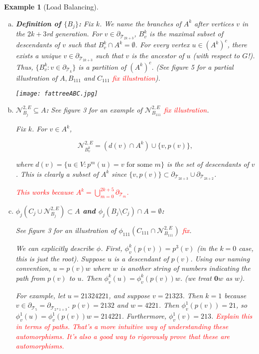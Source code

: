 \documentclass[12pt]{article}
\newcommand{\mc}{\mathcal}
\newcommand{\te}{\text}
\newcommand{\tr}{\textcolor{red}}
\newcommand{\ind}{\hspace{24pt}}
\newcommand{\bdry}[1]{\partial_{#1}}				%
\renewcommand{\root}{\mathbf{0}}					%
\newcommand{\indx}[1]{^{#1}}						%
\newcommand{\deneigh}[1]{\mc{N}^{2,E}_{#1}}			%
\newcommand{\tree}[1]{\mc{T}_{#1}}					%
\newcommand{\desc}{d}								%
\newtheorem{example}[thms]{Example}
\begin{document}
\begin{example}[Load Balancing]
\begin{description}
\begin{enumerate}[(a)]
\item {\bfseries\boldmath Definition of \(\{B_j\}\):} Fix \(k\). We name the branches of \(A\indx{k}\) after vertices \(v\) in the \(2k + 3\)rd generation. For \(v \in \bdry{\tree{2k+3}}\), \(B\indx{k}_v\) is the maximal subset of descendants of \(v\) such that \(B\indx{k}_v\cap A\indx{k} = \emptyset\). For every vertex \(u \in (A\indx{k})^c\), there exists a unique \(v \in \bdry{\tree{2k+3}}\) such that \(v\) is the ancestor of \(u\) (with respect to \(G\)!). Thus, \(\{B\indx{k}_v:v \in \bdry{\tree{k}}\}\) is a partition of \((A\indx{k})^c\). (See figure 5 for a partial illustration of \(A,B_{111}\) and \(C_{111}\) \tr{fix illustration}).

\texttt{[image: fattreeABC.jpg]}

\item {\bfseries\boldmath \(\deneigh{B_j} \subseteq A\):} See figure 3 for an example of \(\deneigh{B_{111}}\) \tr{fix illustration}.

\ind Fix \(k\). For \(v \in A\indx{k}\), 

\[\deneigh{B\indx{k}_v} = \left(\desc(v)\cap A\indx{k}\right)\cup\{v,p(v)\},\]

where \(\desc(v) = \{u\in V: p^m(u) = v\te{ for some }m\}\) is the set of descendants of \(v\). This is clearly a subset of \(A\indx{k}\) since \(\{v,p(v)\} \subset \bdry{\tree{2k+3}}\cup\bdry{\tree{2k+2}}\).

\ind\tr{This works because \(A\indx{k} = \bigcup_{m=0}^{2k+5} \bdry{\tree{m}}\).}

\item {\bfseries\boldmath \(\phi_j(C_j\cup\deneigh{B_j}) \subset A\) and \(\phi_j(B_j\setminus C_j) \cap A = \emptyset\):}

See figure 3 for an illustration of \(\phi_{111}(C_{111}\cap \deneigh{B_{111}})\) \tr{fix}.

\ind We can explicitly describe \(\phi\). First, \(\phi\indx{k}_v(p(v)) = p^3(v)\) (in the \(k=0\) case, this is just the root). Suppose \(u\) is a descendant of \(p(v)\). Using our naming convention, \(u = p(v)w\) where \(w\) is another string of numbers indicating the path from \(p(v)\) to \(u\). Then \(\phi\indx{k}_v(u) = \phi\indx{k}_v(p(v))w\). (we treat \(\root w\) as \(w\)).

\ind For example, let \(u = 21324221\), and suppose \(v = 21323\). Then \(k = 1\) because \(v \in \bdry{\tree{5}} = \bdry{\tree{2*1+3}}\). \(p(v) = 2132\) and \(w = 4221\). Then \(\phi\indx{1}_v(p(v)) = 21\), so \(\phi\indx{1}_v(u) = \phi\indx{1}_v(p(v))w = 214221\). Furthermore, \(\phi\indx{1}_v(v) = 213\). \tr{Explain this in terms of paths. That's a more intuitive way of understanding these automorphisms. It's also a good way to rigorously prove that these are automorphisms.}


\end{enumerate}
\end{description}
\end{example}
\end{document}
